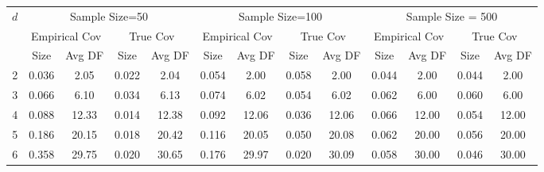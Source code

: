 \documentclass[12pt]{article}
\numberwithin{equation}{section}
\numberwithin{table}{section}
\numberwithin{thm}{section}
\numberwithin{defn}{section}
\numberwithin{lem}{section}
\numberwithin{prop}{section}
\numberwithin{cor}{section}
\numberwithin{rem}{section}
\begin{document}
\begin{sidewaystable}[htbp]
\centering
  \small
\begin{tabular}{|c|cccc|cccc|cccc|}
\hline
\multirow{3}{*}{$d$} & \multicolumn{4}{c|}{Sample Size=50} & \multicolumn{4}{c|}{Sample Size=100} & \multicolumn{4}{c|}{Sample Size = 500} \\ \cline{2-13} 
 & \multicolumn{2}{c|}{Empirical Cov} & \multicolumn{2}{c|}{True Cov} & \multicolumn{2}{c|}{Empirical Cov} & \multicolumn{2}{c|}{True Cov} & \multicolumn{2}{c|}{Empirical Cov} & \multicolumn{2}{c|}{True Cov} \\ \cline{2-13} 
 & \multicolumn{1}{c|}{Size} & \multicolumn{1}{c|}{Avg DF} & \multicolumn{1}{c|}{Size} & Avg DF & \multicolumn{1}{c|}{Size} & \multicolumn{1}{c|}{Avg DF} & \multicolumn{1}{c|}{Size} & Avg DF & \multicolumn{1}{c|}{Size} & \multicolumn{1}{c|}{Avg DF} & \multicolumn{1}{c|}{Size} & Avg DF \\ \hline
2 & \multicolumn{1}{c|}{0.036} & \multicolumn{1}{c|}{2.05} & \multicolumn{1}{c|}{0.022} & 2.04 & \multicolumn{1}{c|}{0.054} & \multicolumn{1}{c|}{2.00} & \multicolumn{1}{c|}{0.058} & 2.00 & \multicolumn{1}{c|}{0.044} & \multicolumn{1}{c|}{2.00} & \multicolumn{1}{c|}{0.044} & 2.00 \\ \hline
3 & \multicolumn{1}{c|}{0.066} & \multicolumn{1}{c|}{6.10} & \multicolumn{1}{c|}{0.034} & 6.13 & \multicolumn{1}{c|}{0.074} & \multicolumn{1}{c|}{6.02} & \multicolumn{1}{c|}{0.054} & 6.02 & \multicolumn{1}{c|}{0.062} & \multicolumn{1}{c|}{6.00} & \multicolumn{1}{c|}{0.060} & 6.00 \\ \hline
4 & \multicolumn{1}{c|}{0.088} & \multicolumn{1}{c|}{12.33} & \multicolumn{1}{c|}{0.014} & 12.38 & \multicolumn{1}{c|}{0.092} & \multicolumn{1}{c|}{12.06} & \multicolumn{1}{c|}{0.036} & 12.06 & \multicolumn{1}{c|}{0.066} & \multicolumn{1}{c|}{12.00} & \multicolumn{1}{c|}{0.054} & 12.00 \\ \hline
5 & \multicolumn{1}{c|}{0.186} & \multicolumn{1}{c|}{20.15} & \multicolumn{1}{c|}{0.018} & 20.42 & \multicolumn{1}{c|}{0.116} & \multicolumn{1}{c|}{20.05} & \multicolumn{1}{c|}{0.050} & 20.08 & \multicolumn{1}{c|}{0.062} & \multicolumn{1}{c|}{20.00} & \multicolumn{1}{c|}{0.056} & 20.00 \\ \hline
6 & \multicolumn{1}{c|}{0.358} & \multicolumn{1}{c|}{29.75} & \multicolumn{1}{c|}{0.020} & 30.65 & \multicolumn{1}{c|}{0.176} & \multicolumn{1}{c|}{29.97} & \multicolumn{1}{c|}{0.020} & 30.09 & \multicolumn{1}{c|}{0.058} & \multicolumn{1}{c|}{30.00} & \multicolumn{1}{c|}{0.046} & 30.00 \\ \hline

\end{tabular}
\end{sidewaystable}
\end{document}
